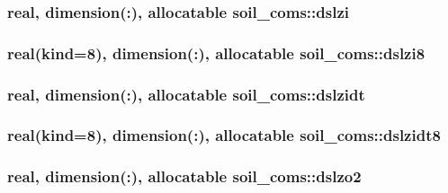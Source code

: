 \subsubsection[{\texorpdfstring{dslzi}{dslzi}}]{\setlength{\rightskip}{0pt plus 5cm}real, dimension(\+:), allocatable soil\+\_\+coms\+::dslzi}\hypertarget{namespacesoil__coms_af2b544726d6dd9705d4b8c7c5714d92d}{}\label{namespacesoil__coms_af2b544726d6dd9705d4b8c7c5714d92d}
\subsubsection[{\texorpdfstring{dslzi8}{dslzi8}}]{\setlength{\rightskip}{0pt plus 5cm}real(kind=8), dimension(\+:), allocatable soil\+\_\+coms\+::dslzi8}\hypertarget{namespacesoil__coms_ad8684255b655da1970dfa6f829724dce}{}\label{namespacesoil__coms_ad8684255b655da1970dfa6f829724dce}
\subsubsection[{\texorpdfstring{dslzidt}{dslzidt}}]{\setlength{\rightskip}{0pt plus 5cm}real, dimension(\+:), allocatable soil\+\_\+coms\+::dslzidt}\hypertarget{namespacesoil__coms_a4b61cf24c813f2846a39570dd4ea05a8}{}\label{namespacesoil__coms_a4b61cf24c813f2846a39570dd4ea05a8}
\subsubsection[{\texorpdfstring{dslzidt8}{dslzidt8}}]{\setlength{\rightskip}{0pt plus 5cm}real(kind=8), dimension(\+:), allocatable soil\+\_\+coms\+::dslzidt8}\hypertarget{namespacesoil__coms_ab5f252a1d4e385eaa66e06a4e7de7bc9}{}\label{namespacesoil__coms_ab5f252a1d4e385eaa66e06a4e7de7bc9}
\subsubsection[{\texorpdfstring{dslzo2}{dslzo2}}]{\setlength{\rightskip}{0pt plus 5cm}real, dimension(\+:), allocatable soil\+\_\+coms\+::dslzo2}\hypertarget{namespacesoil__coms_af12370b1017ccb30ff0d20906aa4a45d}{}\label{namespacesoil__coms_af12370b1017ccb30ff0d20906aa4a45d}
